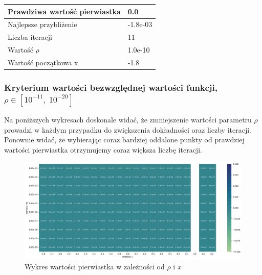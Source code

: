 \documentclass{article}
\begin{document}
\begin{table}[H]
    \centering
    \begin{tabular}{|l|l|}
    \hline
        Prawdziwa wartość pierwiastka & 0.0 \\ \hline
        Najlepsze przybliżenie & -1.8e-03 \\ \hline
        Liczba iteracji & 11 \\ \hline
        Wartość $\rho$ & 1.0e-10 \\ \hline
        Wartość początkowa x & -1.8 \\ \hline
    \end{tabular}
\end{table}


\subsubsection{Kryterium wartości bezwzględnej wartości funkcji, \(\rho \in [10^{-11}, \ 10^{-20}]\)}

Na poniższych wykresach doskonale widać, że zmniejszenie wartości parametru \(\rho\) prowadzi w każdym przypadku do zwiększenia dokładności oraz liczby iteracji. Ponownie widać, że wybierając coraz bardziej oddalone punkty od prawdziej wartości pierwiastka otrzymujemy coraz większa liczbę iteracji. 

\begin{figure}[H]
  \centering
  \begin{minipage}[b]{\textwidth}
    \includegraphics[width=\textwidth]{heatmap03.png}
    \caption{Wykres wartości pierwiastka w zależności od \(\rho\) i \(x\)}
  \end{minipage}
  
\end{figure}
\end{document}
